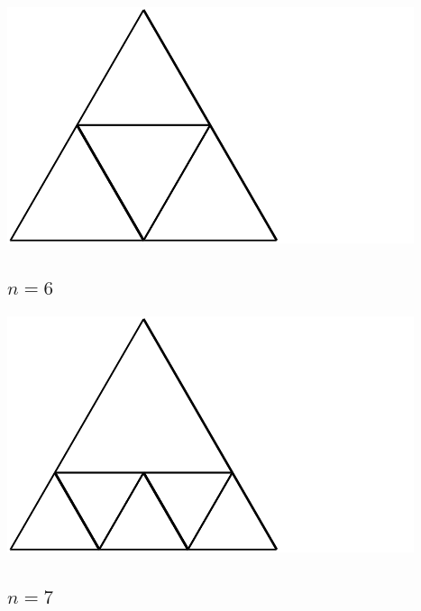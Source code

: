 \documentclass[12pt,amstags,fleqn]{article}
\theoremstyle{plain}
\theoremstyle{definition}
\begin{document}
\includegraphics{output-dissections-dissection4_i36_r3_c1.pdf}

\subsection*{$n = 6$}

\includegraphics{output-dissections-dissection6_i41_r1_c3.pdf}

\subsection*{$n = 7$}
\end{document}
